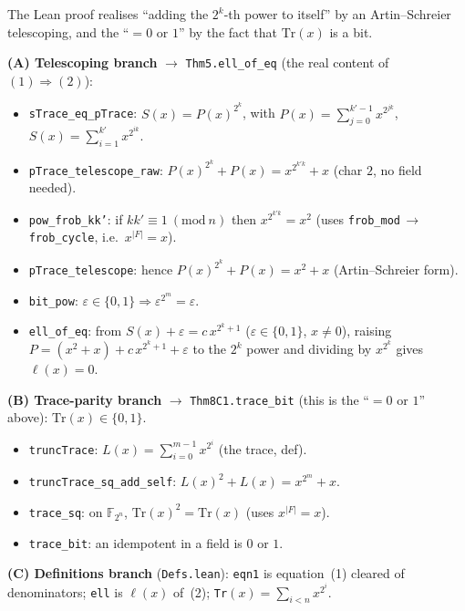 \documentclass[11pt]{article}
\newcommand{\lc}[1]{\texttt{#1}}
\begin{document}
\noindent The Lean proof realises ``adding the $2^k$-th power to itself''
by an Artin--Schreier telescoping, and the ``$=0$ or $1$'' by the fact
that $\mathrm{Tr}(x)$ is a bit.

\medskip
\noindent\textbf{(A) Telescoping branch} $\to$ \lc{Thm5.ell\_of\_eq}
(the real content of $(1)\Rightarrow(2)$):
\begin{itemize}\itemsep1pt
\item \lc{sTrace\_eq\_pTrace}: $S(x)=P(x)^{2^k}$, with
      $P(x)=\sum_{j=0}^{k'-1}x^{2^{jk}}$, $S(x)=\sum_{i=1}^{k'}x^{2^{ik}}$.
\item \lc{pTrace\_telescope\_raw}: $P(x)^{2^k}+P(x)=x^{2^{k'k}}+x$ (char $2$, no field needed).
\item \lc{pow\_frob\_kk'}: if $kk'\equiv1\ (\mathrm{mod}\ n)$ then $x^{2^{k'k}}=x^2$
      (uses \lc{frob\_mod}\,$\to$\,\lc{frob\_cycle}, i.e.\ $x^{|F|}=x$).
\item \lc{pTrace\_telescope}: hence $P(x)^{2^k}+P(x)=x^2+x$ (Artin--Schreier form).
\item \lc{bit\_pow}: $\varepsilon\in\{0,1\}\Rightarrow\varepsilon^{2^m}=\varepsilon$.
\item \lc{ell\_of\_eq}: from $S(x)+\varepsilon=c\,x^{2^k+1}$ ($\varepsilon\in\{0,1\}$, $x\neq0$),
      raising $P=(x^2+x)+c\,x^{2^k+1}+\varepsilon$ to the $2^k$ power and dividing by $x^{2^k}$
      gives $\ell(x)=0$.
\end{itemize}

\noindent\textbf{(B) Trace-parity branch} $\to$ \lc{Thm8C1.trace\_bit}
(this is the ``$=0$ or $1$'' above): $\mathrm{Tr}(x)\in\{0,1\}$.
\begin{itemize}\itemsep1pt
\item \lc{truncTrace}: $L(x)=\sum_{i=0}^{m-1}x^{2^i}$ (the trace, def).
\item \lc{truncTrace\_sq\_add\_self}: $L(x)^2+L(x)=x^{2^m}+x$.
\item \lc{trace\_sq}: on $\mathbb F_{2^n}$, $\mathrm{Tr}(x)^2=\mathrm{Tr}(x)$ (uses $x^{|F|}=x$).
\item \lc{trace\_bit}: an idempotent in a field is $0$ or $1$.
\end{itemize}

\noindent\textbf{(C) Definitions branch} (\lc{Defs.lean}):
\lc{eqn1} is equation~(1) cleared of denominators; \lc{ell} is
$\ell(x)$ of~(2); \lc{Tr}$(x)=\sum_{i<n}x^{2^i}$.
\end{document}
